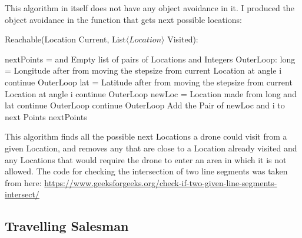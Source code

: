 \documentclass[12pt]{article}
\begin{document}
This algorithm in itself does not have any object avoidance in it. I produced the object avoidance in the function that gets next possible locations:
\begin{algorithm}
\caption{Reachable(Location Current, List$\langle Location \rangle$ Visited):}
\begin{algorithmic}[1]
 \STATE nextPoints = and Empty list of pairs of Locations and Integers
 \STATE OuterLoop:
    \STATE long = Longitude after from moving the stepsize from current Location at angle i
    \STATE continue OuterLoop
    \ENDIF
    \STATE lat = Latitude after from moving the stepsize from current Location at angle i
    \STATE continue OuterLoop
    \ENDIF
    \STATE newLoc = Location made from long and lat
    \STATE continue OuterLoop
    \ENDIF
    \ENDFOR
    \STATE continue OuterLoop
    \ENDIF
    \ENDFOR
    \ENDIF
    \ENDFOR
    \STATE Add the Pair of newLoc and i to next Points
 \ENDFOR
 \RETURN nextPoints
\end{algorithmic}
\end{algorithm}
\newline
This algorithm finds all the possible next Locations a drone could visit from a given Location, and removes any that are close to a Location already visited and any Locations that would require the drone to enter an area in which it is not allowed.\newline \newline
The code for checking the intersection of two line segments was taken from here:\newline
\url{https://www.geeksforgeeks.org/check-if-two-given-line-segments-intersect/}
\newpage

\subsection{Travelling Salesman}
\end{document}
